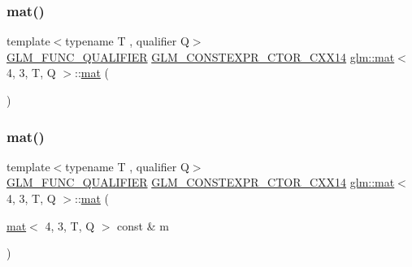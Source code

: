 \subsubsection{\texorpdfstring{mat()}{mat()}\hspace{0.1cm}{\footnotesize\ttfamily [1/21]}}
{\footnotesize\ttfamily template$<$typename T , qualifier Q$>$ \\
\hyperlink{setup_8hpp_a33fdea6f91c5f834105f7415e2a64407}{G\+L\+M\+\_\+\+F\+U\+N\+C\+\_\+\+Q\+U\+A\+L\+I\+F\+I\+ER} \hyperlink{setup_8hpp_a0900f9145e68bf6061b6f5e7be3fa751}{G\+L\+M\+\_\+\+C\+O\+N\+S\+T\+E\+X\+P\+R\+\_\+\+C\+T\+O\+R\+\_\+\+C\+X\+X14} \hyperlink{structglm_1_1mat}{glm\+::mat}$<$ 4, 3, T, Q $>$\+::\hyperlink{structglm_1_1mat}{mat} (\begin{DoxyParamCaption}{ }\end{DoxyParamCaption})}

\mbox{\label{structglm_1_1mat_3_014_00_013_00_01_t_00_01_q_01_4_a59686658a0451cff1cda8c000e6b3579}} 
\subsubsection{\texorpdfstring{mat()}{mat()}\hspace{0.1cm}{\footnotesize\ttfamily [2/21]}}
{\footnotesize\ttfamily template$<$typename T , qualifier Q$>$ \\
\hyperlink{setup_8hpp_a33fdea6f91c5f834105f7415e2a64407}{G\+L\+M\+\_\+\+F\+U\+N\+C\+\_\+\+Q\+U\+A\+L\+I\+F\+I\+ER} \hyperlink{setup_8hpp_a0900f9145e68bf6061b6f5e7be3fa751}{G\+L\+M\+\_\+\+C\+O\+N\+S\+T\+E\+X\+P\+R\+\_\+\+C\+T\+O\+R\+\_\+\+C\+X\+X14} \hyperlink{structglm_1_1mat}{glm\+::mat}$<$ 4, 3, T, Q $>$\+::\hyperlink{structglm_1_1mat}{mat} (\begin{DoxyParamCaption}\item[{\hyperlink{structglm_1_1mat}{mat}$<$ 4, 3, T, Q $>$ const \&}]{m }\end{DoxyParamCaption})}

\mbox{\label{structglm_1_1mat_3_014_00_013_00_01_t_00_01_q_01_4_afe2aacdb76797f1fcfef7e6d1268c764}} 
